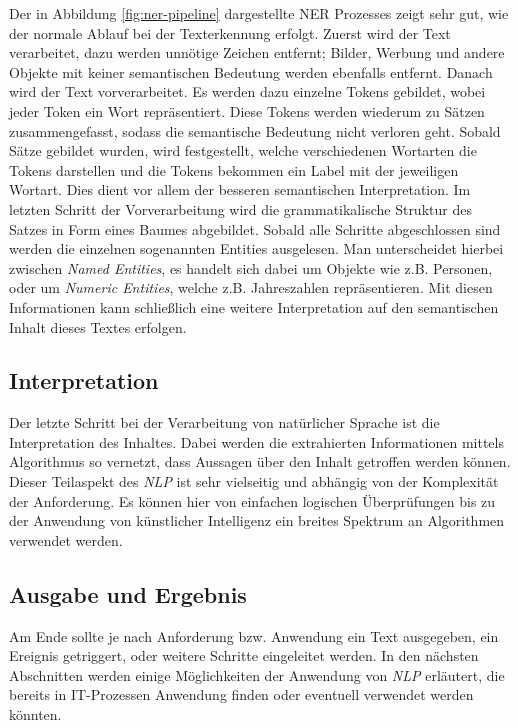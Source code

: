 Der in Abbildung \ref{fig:ner-pipeline} dargestellte NER Prozesses zeigt sehr gut, wie der normale Ablauf bei der Texterkennung erfolgt. Zuerst wird der Text verarbeitet, dazu werden unnötige Zeichen entfernt; Bilder, Werbung und andere Objekte mit keiner semantischen Bedeutung werden ebenfalls entfernt. Danach wird der Text vorverarbeitet. Es werden dazu einzelne Tokens gebildet, wobei jeder Token ein Wort repräsentiert. Diese Tokens werden wiederum zu Sätzen zusammengefasst, sodass die semantische Bedeutung nicht verloren geht. Sobald Sätze gebildet wurden, wird festgestellt, welche verschiedenen Wortarten die Tokens darstellen und die Tokens bekommen ein Label mit der jeweiligen Wortart. Dies dient vor allem der besseren semantischen Interpretation. Im letzten Schritt der Vorverarbeitung wird die grammatikalische Struktur des Satzes in Form eines Baumes abgebildet. Sobald alle Schritte abgeschlossen sind werden die einzelnen sogenannten Entities ausgelesen. Man unterscheidet hierbei zwischen \textit{Named Entities}, es handelt sich dabei um Objekte wie z.B. Personen, oder um \textit{Numeric Entities}, welche z.B. Jahreszahlen repräsentieren. Mit diesen Informationen kann schließlich eine weitere Interpretation auf den semantischen Inhalt dieses Textes erfolgen.

\subsection{Interpretation}
Der letzte Schritt bei der Verarbeitung von natürlicher Sprache ist die Interpretation des Inhaltes. Dabei werden die extrahierten Informationen mittels Algorithmus so vernetzt, dass Aussagen über den Inhalt getroffen werden können. Dieser Teilaspekt des \textit{NLP} ist sehr vielseitig und abhängig von der Komplexität der Anforderung. Es können hier von einfachen logischen Überprüfungen bis zu der Anwendung von künstlicher Intelligenz ein breites Spektrum an Algorithmen verwendet werden. 

\subsection{Ausgabe und Ergebnis}
Am Ende sollte je nach Anforderung bzw. Anwendung ein Text ausgegeben, ein Ereignis getriggert, oder weitere Schritte eingeleitet werden. In den nächsten Abschnitten werden einige Möglichkeiten der Anwendung von \textit{NLP} erläutert, die bereits in IT-Prozessen Anwendung finden oder eventuell verwendet werden könnten. 

